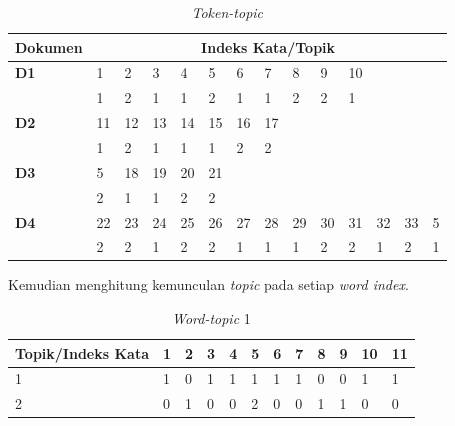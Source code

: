 \begin{table}[H]
	\caption{\textit{Token-topic}}
	\centering
	\small
	\begin{adjustbox}{width=1\textwidth}
	\begin{tabular}{|p{2.5cm}|l|l|l|l|l|l|l|l|l|l|l|l|l|}
		\hline
		\textbf{Dokumen} &\multicolumn{13}{c|}{\textbf{ Indeks Kata/Topik}} \\
		\hline
		\textbf{D1} & 1 & 2 & 3 & 4 & 5 & 6 & 7 & 8 & 9 & 10 & & & \\
		\hline
		& 1 & 2 & 1 & 1 & 2 & 1 & 1 & 2 & 2 & 1 & & & \\
		\hline
		\textbf{D2} & 11 & 12 & 13 & 14 & 15 & 16 & 17 & & & & & & \\
		\hline
		& 1 & 2 & 1 & 1 & 1 & 2 & 2 & & & & & & \\
		\hline
		\textbf{D3} & 5 & 18 & 19 & 20 & 21 & & & & & & & & \\
		\hline
		& 2 & 1 & 1 & 2 & 2 & & & & & & & & \\
		\hline
		\textbf{D4} & 22 & 23 & 24 & 25 & 26 & 27 & 28 & 29 & 30 & 31 & 32 & 33 & 5 \\
		\hline
		& 2 & 2 & 1 & 2 & 2 & 1 & 1 & 1 & 2 & 2 & 1 & 2 & 1 \\
		\hline
	\end{tabular}
	\end{adjustbox}
\end{table}
\noindent Kemudian menghitung kemunculan \textit{topic} pada setiap \textit{
	word index}.
\begin{table}[H]
	\caption{\textit{Word-topic} 1}
	\centering
	\small
	\begin{adjustbox}{width=1\textwidth}
	\begin{tabular}{|p{3.2cm}|p{0.5cm}|p{0.5cm}|p{0.5cm}|p{0.5cm}|p{0.5cm}|p{0.5cm}|p{0.5cm}|p{0.5cm}|p{0.5cm}|p{0.5cm}|p{0.5cm}|}
		\hline
		\textbf{Topik/Indeks Kata} & \textbf{1} & \textbf{2} & \textbf{3} & \textbf{4} & \textbf{5} & \textbf{6} & \textbf{7} & \textbf{8} & \textbf{9} & \textbf{10} & \textbf{11} \\
		\hline
		1 & 1 & 0 & 1 & 1 & 1 & 1 & 1 & 0 & 0 & 1 & 1 \\
		\hline
		2 & 0 & 1 & 0 & 0 & 2 & 0 & 0 & 1 & 1 & 0 & 0 \\
		\hline
	\end{tabular}
	\end{adjustbox}
\end{table} 

